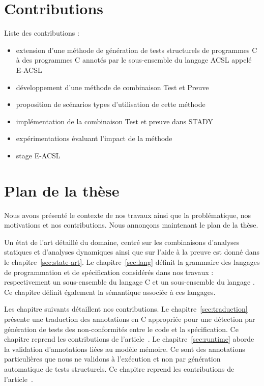 \section{Contributions}
\label{sec:contrib}




Liste des contributions :
\begin{itemize}
\item extension d'une méthode de génération de tests structurels de programmes C
  à des programmes C annotés par le sous-ensemble du langage ACSL appelé E-ACSL
\item développement d'une méthode de combinaison Test et Preuve
\item proposition de scénarios types d'utilisation de cette méthode
\item implémentation de la combinaison Test et preuve dans STADY
\item expérimentations évaluant l'impact de la méthode
\item stage E-ACSL
\end{itemize}


\section{Plan de la thèse}
\label{sec:plan}


Nous avons présenté le contexte de nos travaux ainsi que la problématique, nos
motivations et nos contributions.
Nous annonçons maintenant le plan de la thèse.

Un état de l'art détaillé du domaine, centré sur les combinaisons d'analyses
statiques et d'analyses dynamiques ainsi que sur l'aide à la preuve est
donné dans le chapitre~\ref{sec:state-art}.
Le chapitre~\ref{sec:lang} définit la grammaire des langages de programmation et
de spécification considérés dans nos travaux : respectivement un sous-ensemble
du langage C et un sous-ensemble du langage \acsl.
Ce chapitre définit également la sémantique associée à ces langages.

Les chapitre suivants détaillent nos contributions.
Le chapitre~\ref{sec:traduction} présente une traduction des annotations \acsl
en C appropriée pour une détection par génération de tests des non-conformités
entre le code et la spécification.
Ce chapitre reprend les contributions de l'article~\cite{Petiot/SCAM14}.
Le chapitre~\ref{sec:runtime} aborde la validation d'annotations \acsl liées au
modèle mémoire.
Ce sont des annotations particulières que nous ne validons à l'exécution et non
par génération automatique de tests structurels.
Ce chapitre reprend les contributions de l'article~\cite{Kosmatov/RV13}.


